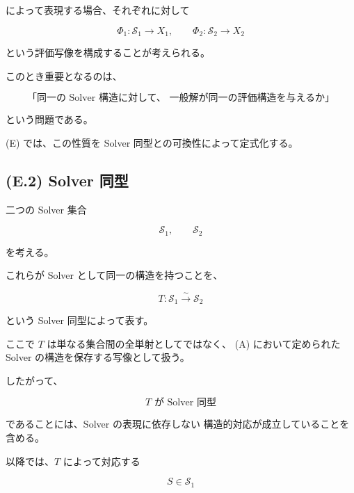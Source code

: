 \documentclass[a4paper,11pt]{article}
\newcommand{\Solver}{\mathcal{S}}
\begin{document}
によって表現する場合、それぞれに対して

\begin{equation}
    \Phi_1:
    \Solver_1\to X_1,
    \qquad
    \Phi_2:
    \Solver_2\to X_2
\end{equation}

という評価写像を構成することが考えられる。

このとき重要となるのは、

\begin{equation}
    \text{「同一の Solver 構造に対して、
    一般解が同一の評価構造を与えるか」}
\end{equation}

という問題である。

(E) では、この性質を Solver 同型との可換性によって定式化する。


\subsection{(E.2) Solver 同型}
\label{subsec:E2}

二つの Solver 集合

\begin{equation}
    \Solver_1,
    \qquad
    \Solver_2
\end{equation}

を考える。

これらが Solver として同一の構造を持つことを、

\begin{equation}
    \boxed{
        T:
        \Solver_1
        \overset{\sim}{\longrightarrow}
        \Solver_2
    }
    \label{eq:E-solver-isomorphism}
\end{equation}

という Solver 同型によって表す。

ここで $T$ は単なる集合間の全単射としてではなく、
(A) において定められた Solver の構造を保存する写像として扱う。

したがって、

\begin{equation}
    T
    \text{ が Solver 同型}
\end{equation}

であることには、Solver の表現に依存しない
構造的対応が成立していることを含める。

以降では、$T$ によって対応する

\begin{equation}
    S\in\Solver_1
\end{equation}
\end{document}

